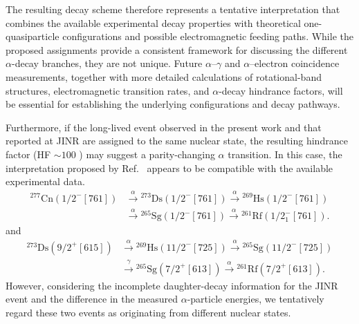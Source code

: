 \documentclass[final,5p,times,twocolumn,number,sort&compress]{elsarticle}
\begin{document}
The resulting decay scheme therefore represents a tentative interpretation that combines the available experimental decay properties with theoretical one-quasiparticle configurations and possible electromagnetic feeding paths. While the proposed assignments provide a consistent framework for discussing the different $\alpha$-decay branches, they are not unique. Future $\alpha$--$\gamma$ and $\alpha$--electron coincidence measurements, together with more detailed calculations of rotational-band structures, electromagnetic transition rates, and $\alpha$-decay hindrance factors, will be essential for establishing the underlying configurations and decay pathways.

Furthermore, if the long-lived event observed in the present work
and that reported at JINR are assigned to the same nuclear state,
the resulting hindrance factor (HF $\sim 100$ \cite{Poenaru1980,Rurarz1983,oganessianMeasurementsCrossSections2004}) may suggest
a parity-changing $\alpha$ transition. In this case, the
interpretation proposed by Ref.~\cite{adamian2016ManifestationStructureHeavy} appears to be compatible
with the available experimental data.
\begin{align*}
^{277}\mathrm{Cn}(1/2^{-}[761])
&\xrightarrow{\alpha}
{}^{273}\mathrm{Ds}(1/2^{-}[761])
\xrightarrow{\alpha}
{}^{269}\mathrm{Hs}(1/2^{-}[761])\\
&\xrightarrow{\alpha}
{}^{265}\mathrm{Sg}(1/2^{-}[761])
\xrightarrow{\alpha}
{}^{261}\mathrm{Rf}(1/2^{-}_1[761]).
\end{align*}
%
and
%
\begin{align*}
^{273}\mathrm{Ds}(9/2^{+}[615])
&\xrightarrow{\alpha}
{}^{269}\mathrm{Hs}(11/2^{-}[725])
\xrightarrow{\alpha}
{}^{265}\mathrm{Sg}(11/2^{-}[725])\\
&\xrightarrow{\gamma}
{}^{265}\mathrm{Sg}(7/2^{+}[613])
\xrightarrow{\alpha}
{}^{261}\mathrm{Rf}(7/2^{+}[613]).
\end{align*}
However, considering
the incomplete daughter-decay information for the JINR event
and the difference in the measured $\alpha$-particle energies,
we tentatively regard these two events as originating from
different nuclear states.

\end{document}
